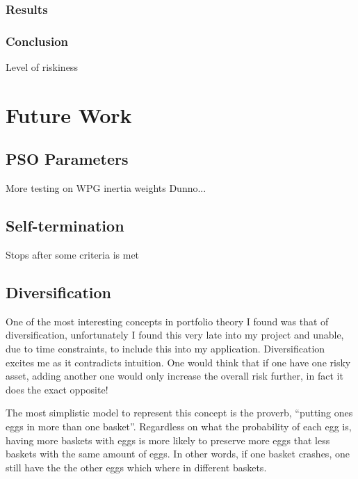 \documentclass{pdfmx4020}
\begin{document}
    \subsection{Results}

    \subsection{Conclusion}

    Level of riskiness



\chapter{Future Work}

  \section{PSO Parameters} %
  \label{sec:parameters}
    More testing on WPG inertia weights
    Dunno...

  \section{Self-termination} %
  \label{sec:self_termination}
    Stops after some criteria is met

  \section{Diversification} %
  \label{sec:diversification}
    One of the most interesting concepts in portfolio theory I found was that of diversification, unfortunately I found this very late into my project and unable, due to time constraints, to include this into my application. Diversification excites me as it contradicts intuition. One would think that if one have one risky asset, adding another one would only increase the overall risk further, in fact it does the exact opposite!

    The most simplistic model to represent this concept is the proverb, ``putting ones eggs in more than one basket''. Regardless on what the probability of each egg is, having more baskets with eggs is more likely to preserve more eggs that less baskets with the same amount of eggs. In other words, if one basket crashes, one still have the the other eggs which where in different baskets. 
\end{document}

